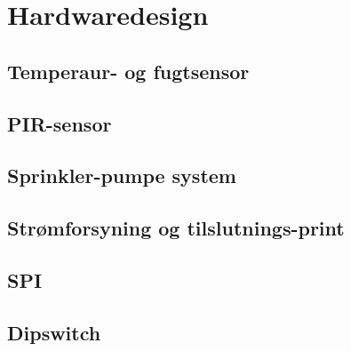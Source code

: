 \chapter{Hardwaredesign}

\section{Temperaur- og fugtsensor}


\section{PIR-sensor}


\section{Sprinkler-pumpe system}


\section{Strømforsyning og tilslutnings-print}


\section{SPI}


\section{Dipswitch}

